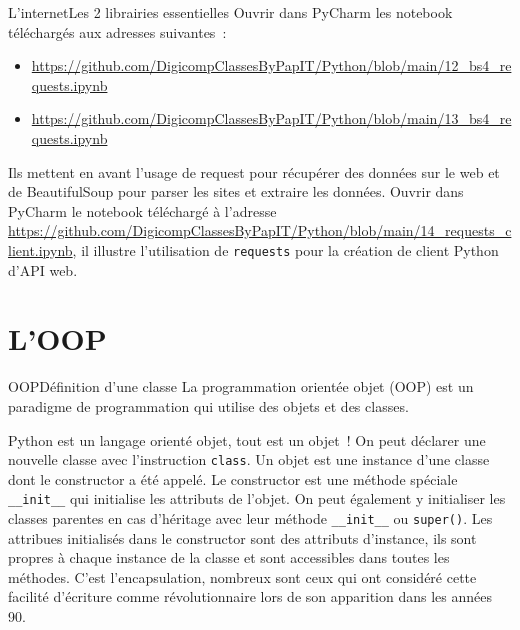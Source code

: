 \documentclass{beamer}
\begin{document}
    \begin{frame}{L'internet}{Les 2 librairies essentielles}
        Ouvrir dans PyCharm les notebook téléchargés aux adresses suivantes~:
        \begin{itemize}
            \item \url{https://github.com/DigicompClassesByPapIT/Python/blob/main/12_bs4_requests.ipynb}
            \item \url{https://github.com/DigicompClassesByPapIT/Python/blob/main/13_bs4_requests.ipynb}
        \end{itemize}
        Ils mettent en avant l'usage de request pour récupérer des données sur le web et de BeautifulSoup pour parser les sites et extraire les données.
        \bigbreak
        Ouvrir dans PyCharm le notebook téléchargé à l'adresse \url{https://github.com/DigicompClassesByPapIT/Python/blob/main/14_requests_client.ipynb}, il illustre l'utilisation de \lstinline{requests} pour la création de client Python d'API web.
    \end{frame}


    \section{L'OOP}\label{sec:oop}

    \begin{frame}{OOP}{Définition d'une classe}
        La programmation orientée objet (OOP) est un paradigme de programmation qui utilise des objets et des classes.

        Python est un langage orienté objet, tout est un objet~!
        On peut déclarer une nouvelle classe avec l'instruction \lstinline{class}.
        \bigbreak
        Un objet est une instance d'une classe dont le constructor a été appelé.
        Le constructor est une méthode spéciale \lstinline{__init__} qui initialise les attributs de l'objet.
        On peut également y initialiser les classes parentes en cas d'héritage avec leur méthode \lstinline{__init__} ou \lstinline{super()}.
        \bigbreak
        Les attribues initialisés dans le constructor sont des attributs d'instance, ils sont propres à chaque instance de la classe et sont accessibles dans toutes les méthodes.
        C'est l'encapsulation, nombreux sont ceux qui ont considéré cette facilité d'écriture comme révolutionnaire lors de son apparition dans les années 90.
    \end{frame}
\end{document}
